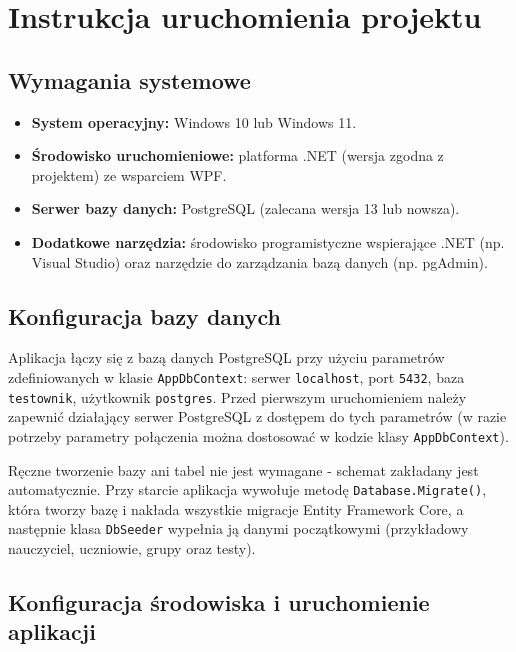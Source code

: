 ﻿\chapter{Instrukcja uruchomienia projektu}
\label{cha:uruchomienie}

\section{Wymagania systemowe}
\label{sec:wymaganiaUruch}

\begin{itemize}
  \item \textbf{System operacyjny:} Windows 10 lub Windows 11.
  \item \textbf{Środowisko uruchomieniowe:} platforma .NET (wersja zgodna z projektem) ze wsparciem WPF.
  \item \textbf{Serwer bazy danych:} PostgreSQL (zalecana wersja 13 lub nowsza).
  \item \textbf{Dodatkowe narzędzia:} środowisko programistyczne wspierające .NET (np. Visual Studio)
        oraz narzędzie do zarządzania bazą danych (np. pgAdmin).
\end{itemize}

\section{Konfiguracja bazy danych}
\label{sec:konfBaza}

Aplikacja łączy się z bazą danych PostgreSQL przy użyciu parametrów zdefiniowanych w klasie
\texttt{AppDbContext}: serwer \texttt{localhost}, port \texttt{5432}, baza \texttt{testownik},
użytkownik \texttt{postgres}. Przed pierwszym uruchomieniem należy zapewnić działający serwer
PostgreSQL z dostępem do tych parametrów (w razie potrzeby parametry połączenia można dostosować
w kodzie klasy \texttt{AppDbContext}).

Ręczne tworzenie bazy ani tabel nie jest wymagane - schemat zakładany jest automatycznie. Przy
starcie aplikacja wywołuje metodę \texttt{Database.Migrate()}, która tworzy bazę i nakłada wszystkie
migracje Entity Framework Core, a następnie klasa \texttt{DbSeeder} wypełnia ją danymi początkowymi
(przykładowy nauczyciel, uczniowie, grupy oraz testy).

\section{Konfiguracja środowiska i uruchomienie aplikacji}
\label{sec:uruchAplikacji}

